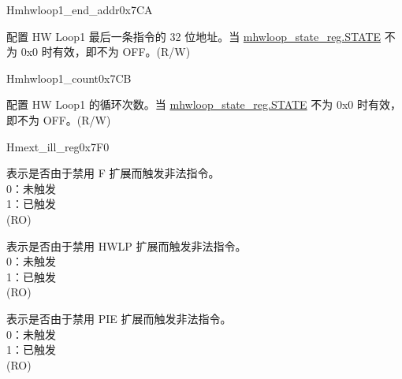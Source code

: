 \begin{register}{H}{mhwloop1\_end\_addr}{0x7CA}\label{regdesc:mhloop1_end_addr}
%
\regnewline%
\begin{regdesc}\begin{reglist}
\label{fielddesc:HWLP1_EA}\item [EA] 配置 HW Loop1 最后一条指令的 32 位地址。当 \hyperref[fielddesc:HWSTATE]{mhwloop\_state\_reg.STATE} 不为 0x0 时有效，即不为 OFF。(R/W)
\end{reglist}\end{regdesc}
\end{register}

\begin{register}{H}{mhwloop1\_count}{0x7CB}\label{regdesc:mhloop1_count}
%
%
\regnewline%
\begin{regdesc}\begin{reglist}
\label{fielddesc:MHLP1_COUNT}\item [COUNT] 配置 HW Loop1 的循环次数。当 \hyperref[fielddesc:HWSTATE]{mhwloop\_state\_reg.STATE} 不为 0x0 时有效，即不为 OFF。(R/W)
\end{reglist}\end{regdesc}
\end{register}

\begin{register}{H}{mext\_ill\_reg}{0x7F0}\label{regdesc:mext_ill_reg}
%
%
%
%
\regnewline%
\begin{regdesc}\begin{reglist}
\label{fielddesc:ILL_FPU}\item [ILL\_FPU] 表示是否由于禁用 F 扩展而触发非法指令。\\
0：未触发\\
1：已触发\\
(RO)
\label{fielddesc:ILL_HWL}\item [ILL\_HWL] 表示是否由于禁用 HWLP 扩展而触发非法指令。\\
0：未触发\\
1：已触发\\
(RO)
\label{fielddesc:ILL_PIE}\item [ILL\_PIE] 表示是否由于禁用 PIE 扩展而触发非法指令。\\
0：未触发\\
1：已触发\\
(RO)
\end{reglist}\end{regdesc}
\end{register}

